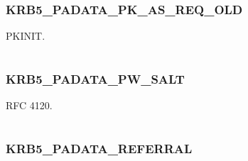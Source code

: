 \documentclass[letterpaper,10pt,english]{sphinxmanual}
\begin{document}
\subsubsection{KRB5\_PADATA\_PK\_AS\_REQ\_OLD}
\label{appdev/refs/macros/KRB5_PADATA_PK_AS_REQ_OLD:krb5-padata-pk-as-req-old}\label{appdev/refs/macros/KRB5_PADATA_PK_AS_REQ_OLD:krb5-padata-pk-as-req-old-data}\label{appdev/refs/macros/KRB5_PADATA_PK_AS_REQ_OLD::doc}

\begin{fulllineitems}
\label{appdev/refs/macros/KRB5_PADATA_PK_AS_REQ_OLD:KRB5_PADATA_PK_AS_REQ_OLD}
\end{fulllineitems}


PKINIT.

\begin{tabulary}{\linewidth}{|L|L|}
\hline

 & 
\\
\hline\end{tabulary}



\subsubsection{KRB5\_PADATA\_PW\_SALT}
\label{appdev/refs/macros/KRB5_PADATA_PW_SALT:krb5-padata-pw-salt-data}\label{appdev/refs/macros/KRB5_PADATA_PW_SALT:krb5-padata-pw-salt}\label{appdev/refs/macros/KRB5_PADATA_PW_SALT::doc}

\begin{fulllineitems}
\label{appdev/refs/macros/KRB5_PADATA_PW_SALT:KRB5_PADATA_PW_SALT}
\end{fulllineitems}


RFC 4120.

\begin{tabulary}{\linewidth}{|L|L|}
\hline

 & 
\\
\hline\end{tabulary}



\subsubsection{KRB5\_PADATA\_REFERRAL}
\label{appdev/refs/macros/KRB5_PADATA_REFERRAL:krb5-padata-referral}\label{appdev/refs/macros/KRB5_PADATA_REFERRAL::doc}\label{appdev/refs/macros/KRB5_PADATA_REFERRAL:krb5-padata-referral-data}
\end{document}
